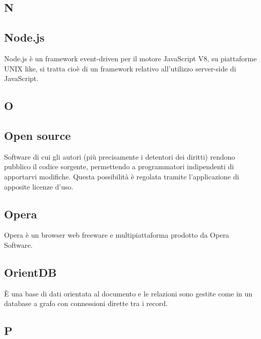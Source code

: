 \newpage

\begin{center}
\Huge\section*{\uppercase{N}}
\end{center}

\subsection*{Node.js}
Node.js è un framework event-driven per il motore JavaScript V8, su piattaforme UNIX
like, si tratta cioè di un framework relativo all'utilizzo server-side di JavaScript.

\newpage

\begin{center}
\Huge\section*{\uppercase{O}}
\end{center}

\subsection*{Open source}
Software di cui gli autori (più precisamente i detentori dei diritti) rendono pubblico
il codice sorgente, permettendo a programmatori indipendenti di apportarvi modifiche.
Questa possibilità è regolata tramite l'applicazione di apposite licenze d'uso.

\subsection*{Opera}
Opera è un browser web freeware e multipiattaforma prodotto da Opera Software.

\subsection*{OrientDB}
È una base di dati orientata al documento e le relazioni sono gestite come in un database a grafo con connessioni dirette tra i record.

\newpage

\begin{center}
\Huge\section*{\uppercase{P}}
\end{center}

